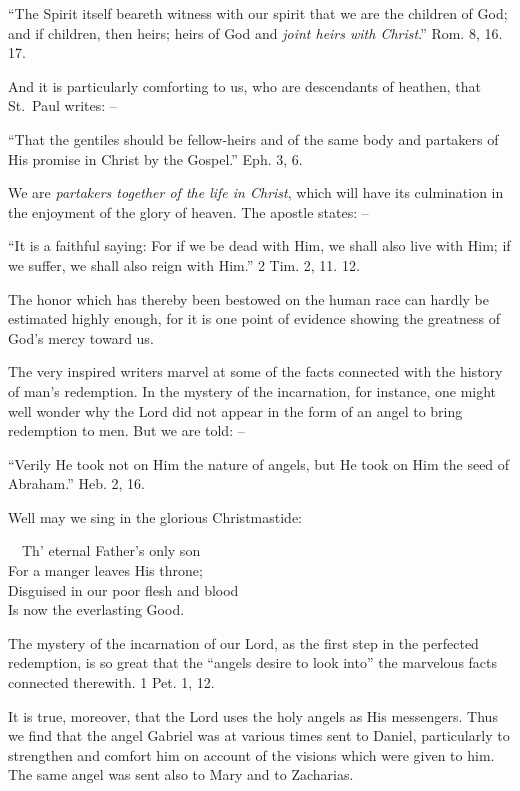 \documentclass[
]{book}
\begin{document}
``The Spirit itself beareth witness with our spirit that we are the children of God; and if children, then heirs; heirs of God and \emph{joint heirs with Christ}.'' Rom. 8, 16. 17.

And it is particularly comforting to us, who are descendants of heathen, that St.~Paul writes: --

``That the gentiles should be fellow-heirs and of the same body and partakers of His promise in Christ by the Gospel.'' Eph. 3, 6.

We are \emph{partakers together of the life in Christ}, which will have its culmination in the enjoyment of the glory of heaven. The apostle states: --

``It is a faithful saying: For if we be dead with Him, we shall also live with Him; if we suffer, we shall also reign with Him.'' 2 Tim. 2, 11. 12.

The honor which has thereby been bestowed on the human race can hardly be estimated highly enough, for it is one point of evidence showing the greatness of God's mercy toward us.

The very inspired writers marvel at some of the facts connected with the history of man's redemption. In the mystery of the incarnation, for instance, one might well wonder why the Lord did not appear in the form of an angel to bring redemption to men. But we are told: --

``Verily He took not on Him the nature of angels, but He took on Him the seed of Abraham.'' Heb. 2, 16.

Well may we sing in the glorious Christmastide:

~~Th' eternal Father's only son\\
\hspace*{0.333em}\hspace*{0.333em}For a manger leaves His throne;\\
\hspace*{0.333em}\hspace*{0.333em}Disguised in our poor flesh and blood\\
\hspace*{0.333em}\hspace*{0.333em}Is now the everlasting Good.

The mystery of the incarnation of our Lord, as the first step in the perfected redemption, is so great that the ``angels desire to look into'' the marvelous facts connected therewith. 1 Pet. 1, 12.

It is true, moreover, that the Lord uses the holy angels as His messengers. Thus we find that the angel Gabriel was at various times sent to Daniel, particularly to strengthen and comfort him on account of the visions which were given to him. The same angel was sent also to Mary and to Zacharias.
\end{document}
